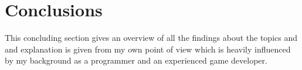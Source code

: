 \chapter{Conclusions}

This concluding section gives an overview of all the findings about the topics
\mss{} and \ogs{} and explanation is given from my own point of view which is
heavily influenced by my background as a programmer and an experienced game
developer.








